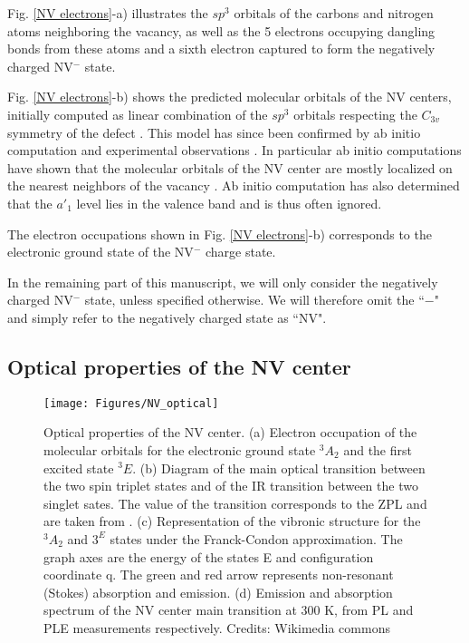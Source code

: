 \documentclass[a4paper,11pt]{report}
\begin{document}
Fig. \ref{NV electrons}-a) illustrates the $sp^3$ orbitals of the carbons and nitrogen atoms neighboring the vacancy, as well as the 5 electrons occupying dangling bonds from these atoms and a sixth electron captured to form the negatively charged NV$^-$ state. 

Fig. \ref{NV electrons}-b) shows the predicted molecular orbitals of the NV centers, initially computed as linear combination of the $sp^3$ orbitals respecting the $C_{3v}$ symmetry of the defect \citep{loubser1978electron}. This model has since been confirmed by ab initio computation and experimental observations \citep{doherty2013nitrogen}. In particular ab initio computations have shown that the molecular orbitals of the NV center are mostly localized on the nearest neighbors of the vacancy \citep{gali2008ab}. Ab initio computation has also determined that the $a'_1$ level lies in the valence band and is thus often ignored.

The electron occupations shown in Fig. \ref{NV electrons}-b) corresponds to the electronic ground state of the NV$^-$ charge state.

In the remaining part of this manuscript, we will only consider the negatively charged NV$^-$ state, unless specified otherwise. We will therefore omit the ``$-$" and simply refer to the negatively charged state as ``NV".
\subsection{Optical properties of the NV center}
\begin{figure}[h!]
\centering
\texttt{[image: Figures/NV\_optical]}
\caption{Optical properties of the NV center. (a) Electron occupation of the molecular orbitals for the electronic ground state $^3A_2$ and the first excited state $^3E$. (b) Diagram of the main optical transition between the two spin triplet states and of the IR transition between the two singlet sates. The value of the transition corresponds to the ZPL and are taken from \citep{doherty2013nitrogen}. (c) Representation of the vibronic structure for the $^3A_2$ and $3^E$ states under the Franck-Condon approximation. The graph axes are the energy of the states E and configuration coordinate q. The green and red arrow represents non-resonant (Stokes) absorption and emission. (d) Emission and absorption spectrum of the NV center main transition at 300 K, from PL and PLE measurements respectively. Credits: Wikimedia commons}
\label{NV optical}
\end{figure}
\end{document}
